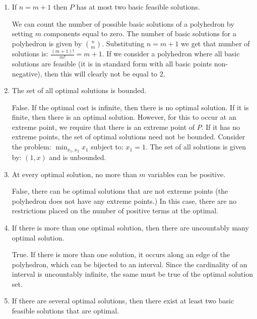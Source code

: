 \documentclass[12pt]{paper}
\begin{document}
\begin{enumerate}
\item If $n = m+1$ then $P$ has at most two basic feasible solutions.

  We can count the number of possible basic solutions of a polyhedron
  by setting $m$ components equal to zero.  The number of basic
  solutions for a polyhedron is given by $\binom{n}{m}$. Substituting
  $n = m+1$ we get that number of solutions is:
  $\frac{(m+1)!}{m!} = m+1$. If we consider a polyhedron where all
  basic solutions are feasible (it is in standard form with all basic
  points non-negative), then this will clearly not be equal to
  2.

  
\item The set of all optimal solutions is bounded.

  False. If the optimal cost is infinite, then there is no optimal
  solution. If it is finite, then there is an optimal
  solution. However, for this to occur at an extreme point, we require
  that there is an extreme point of $P$. If it has no extreme points,
  the set of optimal solutions need not be bounded. Consider the
  problem: $\min_{x_1,x_2} x_1$ subject to: $x_1 = 1$. The set of all
  solutions is given by: $(1,x)$ and is unbounded.

  
\item At every optimal solution, no more than $m$ variables can be
  positive.

  False, there can be optimal solutions that are not extreme points
  (the polyhedron does not have any extreme points.) In this case,
  there are no restrictions placed on the number of positive terms at
  the optimal.
\item If there is more than one optimal solution, then there are
  uncountably many optimal solution.

  True. If there is more than one solution, it occurs along an edge of
  the polyhedron, which can be bijected to an interval. Since the
  cardinality of an interval is uncountably infinite, the same must be
  true of the optimal solution set.
\item If there are several optimal solutions, then there exist at
  least two basic feasible solutions that are optimal.


\end{enumerate}
\end{document}
